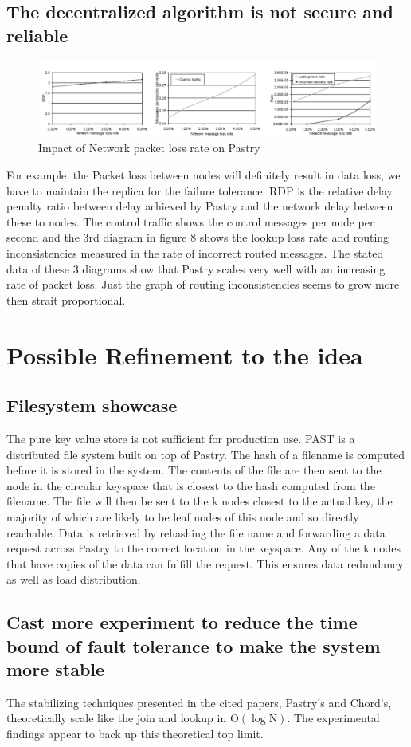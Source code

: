 \documentclass[acmlarge]{acmart}
\begin{document}
\subsection{The decentralized algorithm is not secure and reliable}
\begin{figure}[htbp]
  \centering
  \includegraphics[width=0.6\columnwidth]{./network_packet_loss.png}
  \caption{Impact of Network packet loss rate on Pastry\cite{chandy1985distributed}}
\end{figure}
For example, the Packet loss between nodes will definitely result in data loss, we have to maintain the replica for the failure tolerance. RDP is the relative delay penalty ratio between delay achieved by Pastry and the network delay between these to nodes. The control traffic shows the control messages per node per second and the 3rd diagram in figure 8 shows the lookup loss rate and routing inconsistencies measured in the rate of incorrect routed messages. The stated data of these 3 diagrams show that Pastry scales very well with an increasing rate of packet loss. Just the graph of routing inconsistencies seems to grow more then strait proportional.
\section{Possible Refinement to the idea}
\subsection{Filesystem showcase \cite{rowstron2001storage}}
The pure key value store is not sufficient for production use. PAST is a distributed file system built on top of Pastry. The hash of a filename is computed before it is stored in the system. The contents of the file are then sent to the node in the circular keyspace that is closest to the hash computed from the filename. The file will then be sent to the k nodes closest to the actual key, the majority of which are likely to be leaf nodes of this node and so directly reachable. Data is retrieved by rehashing the file name and forwarding a data request across Pastry to the correct location in the keyspace. Any of the k nodes that have copies of the data can fulfill the request. This ensures data redundancy as well as load distribution.

\subsection{Cast more experiment to reduce the time bound of fault tolerance to make the system more stable}
The stabilizing techniques presented in the cited papers\cite{azmy2018machine}, Pastry's and Chord's, theoretically scale like the join and lookup in  $\mathrm{O}(\log \mathrm{N})$. The experimental findings appear to back up this theoretical top limit.


\end{document}
